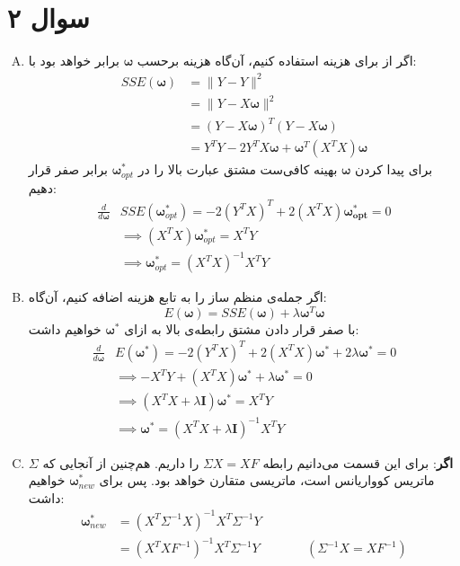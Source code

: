 \documentclass[a4paper, 12pt]{article}
\begin{document}
\section*{سوال ۲}
\begin{enumerate}[A)]
	\item
	اگر از  برای هزینه استفاده کنیم، آن‌گاه هزینه برحسب $\bm{\omega}$ برابر خواهد بود با:
	\[
	\begin{aligned}
		SSE(\bm{\omega}) &= \|Y - \hat{Y}\|^2 \\
		&= \|Y - X\bm{\omega}\|^2 \\
		&= (Y-X\bm{\omega})^T(Y-X\bm{\omega}) \\
		&= Y^TY - 2Y^TX\bm{\omega} + \bm{\omega}^T(X^TX)\bm{\omega}
	\end{aligned}
	\]
	برای پیدا کردن $\bm{\omega}$ بهینه کافی‌ست مشتق عبارت بالا را در
	$\bm{\omega}^\ast_{opt}$
	برابر صفر قرار دهیم:
	\[
	\begin{aligned}
		\frac{d}{d\bm{\omega}}& SSE(\bm{\omega}^\ast_{opt}) = -2(Y^TX)^T + 2(X^TX)\bm{\omega^\ast_{opt}} = 0\\
		&\implies (X^TX)\bm{\omega}^\ast_{opt} = X^TY \\
		&\implies \boxed{\bm{\omega}^\ast_{opt} = (X^TX)^{-1}X^TY}
	\end{aligned}
	\]
	\item
	اگر جمله‌ی منظم ساز  را به تابع هزینه اضافه کنیم، آن‌گاه:
	\[
	E(\bm{\omega}) = SSE(\bm{\omega}) + \lambda \bm{\omega}^T\bm{\omega}
	\]
	با صفر قرار دادن مشتق رابطه‌ی بالا به ازای 
	$\bm{\omega}^\ast$
	خواهیم داشت:
	\[
	\begin{aligned}
		\frac{d}{d\bm{\omega}}& E(\bm{\omega}^\ast) = -2(Y^TX)^T + 2(X^TX)\bm{\omega}^\ast + 2\lambda\bm{\omega}^\ast = 0 \\
		&\implies -X^TY + (X^TX)\bm{\omega}^\ast + \lambda\bm{\omega}^\ast = 0 \\
		&\implies (X^TX + \lambda\bm{I})\bm{\omega}^\ast = X^TY \\
		&\implies \boxed{\bm{\omega}^\ast = (X^TX + \lambda\bm{I})^{-1}X^TY}
	\end{aligned}
	\]
	\item
	\textbf{اگر}:
	برای این قسمت می‌دانیم رابطه 
	$\Sigma X = X F$
	را داریم. هم‌چنین از آنجایی که $\Sigma$ ماتریس کوواریانس است، ماتریسی متقارن خواهد بود. پس برای
	$\bm{\omega}^\ast_{new}$
	خواهیم داشت:
	\[
	\begin{aligned}
		\bm{\omega}^\ast_{new}&= \left(X^T\Sigma^{-1}X\right)^{-1}X^T\Sigma^{-1}Y \\
			&= \left(X^TXF^{-1}\right)^{-1}X^T\Sigma^{-1}Y &&\qquad (\Sigma^{-1}X = XF^{-1}) \\

\end{aligned}\]
\end{enumerate}
\end{document}
